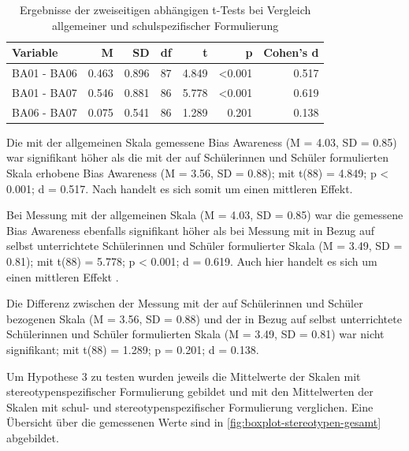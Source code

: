 \begin{table}[h!]
	\begin{tabularx}{\textwidth}{X | r | r | r | r | r | r}
		\hline
		Variable & M & SD & df & t & p & Cohen's d\\
		\hline
		BA01 - BA06 & 0.463 & 0.896 & 87 & 4.849 & <0.001 & 0.517\\
		BA01 - BA07 & 0.546 & 0.881 & 86 & 5.778 & <0.001 & 0.619\\
		BA06 - BA07 & 0.075 & 0.541 & 86 & 1.289 & 0.201 & 0.138\\
		\hline
	\end{tabularx}
	\caption{Ergebnisse der zweiseitigen abhängigen t-Tests bei Vergleich allgemeiner und schulspezifischer Formulierung}
	\label{tab:t-tests-allgemein-gesamt}
\end{table}

Die mit der allgemeinen Skala gemessene Bias Awareness (M = 4.03, SD = 0.85) war signifikant höher als die mit der auf Schülerinnen und Schüler formulierten Skala erhobene Bias Awareness (M = 3.56, SD = 0.88); mit t(88) = 4.849; p < 0.001; d = 0.517.
Nach \citet{cohen1992power} handelt es sich somit um einen mittleren Effekt.

Bei Messung mit der allgemeinen Skala (M = 4.03, SD = 0.85) war die gemessene Bias Awareness ebenfalls signifikant höher als bei Messung mit in Bezug auf selbst unterrichtete Schülerinnen und Schüler formulierter Skala (M = 3.49, SD = 0.81); mit t(88) = 5.778; p < 0.001; d = 0.619.
Auch hier handelt es sich um einen mittleren Effekt \citep{cohen1992power}.

Die Differenz zwischen der Messung mit der auf Schülerinnen und Schüler bezogenen Skala (M = 3.56, SD = 0.88) und der in Bezug auf selbst unterrichtete Schülerinnen und Schüler formulierten Skala (M = 3.49, SD = 0.81) war nicht signifikant; mit t(88) = 1.289; p = 0.201; d = 0.138.

Um Hypothese 3 zu testen wurden jeweils die Mittelwerte der Skalen mit stereotypenspezifischer Formulierung gebildet und mit den Mittelwerten der Skalen mit schul- und stereotypenspezifischer Formulierung verglichen.
Eine Übersicht über die gemessenen Werte sind in \autoref{fig:boxplot-stereotypen-gesamt} abgebildet.

